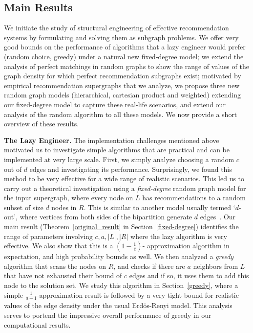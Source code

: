 \subsection{Main Results}
We initiate the study of structural engineering of effective
recommendation systems by formulating and solving them as subgraph
problems. We offer very good bounds on the performance of algorithms
that a lazy engineer would prefer (random choice, greedy) under a
natural new fixed-degree model; we extend the analysis of perfect
matchings in random graphs to show the range of values of the graph
density for which perfect recommendation subgraphs exist; motivated by
empirical recommendation supergraphs that we analyze, we propose three
new random graph models (hierarchical, cartesian product and weighted)
extending our fixed-degree model to capture these real-life scenarios,
and extend our analysis of the random algorithm to all these
models. We now provide a short overview of these results. 


{\bf The Lazy Engineer.} The implementation challenges mentioned above
motivated us to investigate simple algorithms that are practical and can 
be implemented at very large scale. First, we simply analyze choosing a random
$c$ out of $d$ edges and investigating its performance.  Surprisingly,
we found this method to be very effective for a wide range of
realistic scenarios. This led us to carry out a theoretical
investigation using a {\em fixed-degree} random graph model for the
input supergraph, where every node on $L$ has recommendations to a
random subset of size $d$ nodes in $R$.  This is similar to another
model usually termed `$d$-out', where vertices from both sides of the
bipartition generate $d$ edges~\cite{FriezePittel2004}. Our main
result (Theorem~\ref{original_result} in Section~\ref{fixed-degree})
identifies the range of parameters involving $c,a,|L|, |R|$ where the
lazy algorithm is very effective. We also show that this is a
$(1-\frac1e)$- approximation algorithm in expectation, and high
probability bounds as well.  We then analyzed a {\em greedy} algorithm
that scans the nodes on $R$, and checks
if there are $a$ neighbors from $L$ that have not exhausted their
bound of $c$ edges and if so, it uses them to add
this node to the solution set. We study this algorithm in
Section~\ref{greedy}, where a simple $\frac{1}{a+1}$-approximation
result is followed by a very tight bound for realistic values of the
edge density under the usual Erd\"os-Renyi
model\cite{ErdosRenyi59}. This analysis serves to portend the
impressive overall performance of greedy in our computational
results. \vs

